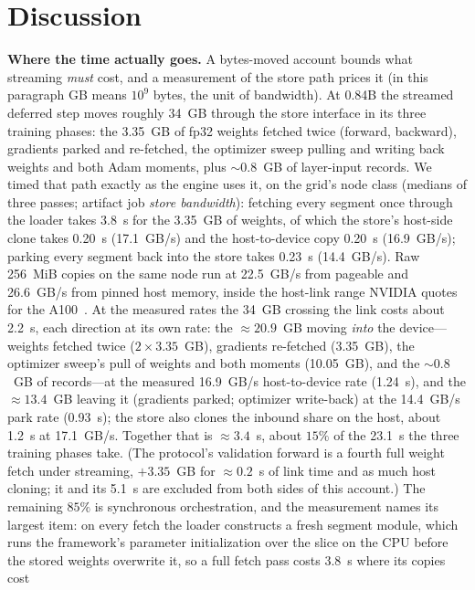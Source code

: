 \documentclass[journal]{IEEEtran}
\begin{document}
\section{Discussion}\label{sec:disc}
\textbf{Where the time actually goes.} A bytes-moved account bounds what
streaming \emph{must} cost, and a measurement of the store path prices it
(in this paragraph GB means $10^9$ bytes, the unit of bandwidth). At 0.84B
the streamed deferred step moves roughly 34~GB through the store
interface in its three training phases: the 3.35~GB of fp32 weights fetched
twice (forward, backward),
gradients parked and re-fetched, the optimizer sweep pulling and writing
back weights and both Adam moments, plus ${\sim}0.8$~GB of layer-input
records. We timed that path exactly as the engine uses it, on the grid's
node class (medians of three passes; artifact job \emph{store bandwidth}):
fetching every segment once through the loader takes 3.8~s for the
3.35~GB of weights, of which the store's host-side clone takes 0.20~s
(17.1~GB/s) and the host-to-device copy 0.20~s (16.9~GB/s); parking every
segment back into the store takes 0.23~s (14.4~GB/s). Raw 256~MiB copies
on the same node run at 22.5~GB/s from pageable and 26.6~GB/s from pinned
host memory, inside the host-link range NVIDIA quotes for the
A100~\cite{nvidia_a100}. At the measured rates the 34~GB crossing the link
costs about 2.2~s, each direction at its own rate: the ${\approx}20.9$~GB
moving \emph{into} the device---weights fetched twice ($2{\times}3.35$~GB),
gradients re-fetched (3.35~GB), the optimizer sweep's pull of weights and both
moments (10.05~GB), and the ${\sim}0.8$~GB of records---at the measured
16.9~GB/s host-to-device rate (1.24~s), and the ${\approx}13.4$~GB leaving it
(gradients parked; optimizer write-back) at the 14.4~GB/s park rate (0.93~s);
the store also clones the inbound share on the host, about 1.2~s at
17.1~GB/s. Together that is ${\approx}3.4$~s, about $15\%$ of the 23.1~s the
three training phases take. (The protocol's validation forward is a fourth
full weight fetch under streaming, ${+}3.35$~GB for ${\approx}0.2$~s of link
time and as much host cloning; it and its 5.1~s are excluded from both sides
of this account.) The remaining $85\%$ is synchronous orchestration, and the
measurement names its largest item: on every fetch the loader constructs
a fresh segment module, which runs the framework's parameter
initialization over the slice on the CPU before the stored weights
overwrite it, so a full fetch pass costs 3.8~s where its copies cost
\end{document}
